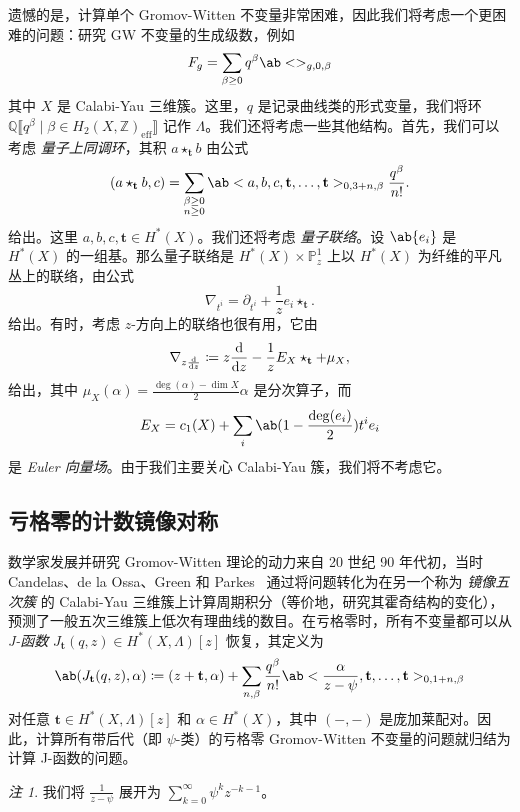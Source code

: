 \documentclass{amsart}
\theoremstyle{definition}
\theoremstyle{remark}
\newtheorem{rmk}[thm]{注}
\theoremstyle{plain}
\theoremstyle{definition}
\theoremstyle{remark}
\newcommand{\Z}{\mathbb{Z}}
\newcommand{\Q}{\mathbb{Q}}
\renewcommand{\P}{\mathbb{P}}
\newcommand{\mbf}[1]{\mathbf{#1}}
\newcommand{\mr}[1]{\mathrm{#1}}
\newcommand{\1}{\mathbf{1}}
\newcommand{\2}{\mathbf{2}}
\newcommand{\3}{\mathbf{3}}
\newcommand{\ps}[1]{\llbracket #1 \rrbracket}
\begin{document}
遗憾的是，计算单个 Gromov-Witten 不变量非常困难，因此我们将考虑一个更困难的问题：研究 GW 不变量的生成级数，例如
\[ F_g = \sum_{\beta \geq 0} q^{\beta} \ab<>_{g,0,\beta} \]
其中 \(X\) 是 Calabi-Yau 三维簇。这里，\(q\) 是记录曲线类的形式变量，我们将环 \(\Q\ps{q^{\beta} \mid \beta \in H_2(X, \Z)_{\mr{eff}}}\) 记作 \(\Lambda\)。我们还将考虑一些其他结构。首先，我们可以考虑 \textit{量子上同调环}，其积 \(a \star_{\mbf{t}} b\) 由公式
\[
    (a \star_{\mbf{t}} b, c) = \sum_{\substack{\beta \geq 0 \\ n \geq 0}} \ab<a,b,c, \mbf{t}, \ldots, \mbf{t}>_{0,3+n,\beta} \frac{q^{\beta}}{n!}.
\]
给出。这里 \(a,b,c, \mbf{t} \in H^*(X)\)。我们还将考虑 \textit{量子联络}。设 \(\ab\{ e_i \}\) 是 \(H^*(X)\) 的一组基。那么量子联络是 \(H^*(X) \times \P^1_z\) 上以 \(H^*(X)\) 为纤维的平凡丛上的联络，由公式
\[ \nabla_{t^i} = \partial_{t^i} + \frac{1}{z} e_i \star_{\mbf{t}}. \]
给出。有时，考虑 \(z\)-方向上的联络也很有用，它由
\[ \nabla_{z \odv{}{z}} \coloneqq z \odv{}{z} - \frac{1}{z} E_X \star_{\mbf{t}} + \mu_X, \]
给出，其中 \(\mu_X(\alpha) = \frac{\deg(\alpha) - \dim X}{2} \alpha\) 是分次算子，而
\[ E_X = c_1(X) + \sum_i \ab(1 - \frac{\deg(e_i)}{2})t^i e_i \]
是 \textit{Euler 向量场}。由于我们主要关心 Calabi-Yau 簇，我们将不考虑它。

\subsection{亏格零的计数镜像对称}%
\label{sub:Enumerative mirror symmetry in genus zero}

数学家发展并研究 Gromov-Witten 理论的动力来自 20 世纪 90 年代初，当时 Candelas、de la Ossa、Green 和 Parkes~\cite{CandelasEtAl1991} 通过将问题转化为在另一个称为 \textit{镜像五次簇} 的 Calabi-Yau 三维簇上计算周期积分（等价地，研究其霍奇结构的变化），预测了一般五次三维簇上低次有理曲线的数目。在亏格零时，所有不变量都可以从 \textit{J-函数} \(J_{\mbf{t}}(q,z) \in H^*(X, \Lambda)[z]\) 恢复，其定义为
\[ \ab( J_{\mbf{t}}(q, z), \alpha ) \coloneqq (z + \mbf{t}, \alpha) + \sum_{n, \beta} \frac{q^{\beta}}{n!} \ab< \frac{\alpha}{z-\psi}, \mbf{t}, \ldots, \mbf{t}>_{0,1+n, \beta} \]
对任意 \(\mbf{t} \in H^*(X, \Lambda)[z]\) 和 \(\alpha \in H^*(X)\)，其中 \((-,-)\) 是庞加莱配对。因此，计算所有带后代（即 \(\psi\)-类）的亏格零 Gromov-Witten 不变量的问题就归结为计算 J-函数的问题。

\begin{rmk}
    我们将 \(\frac{1}{z-\psi}\) 展开为 \(\sum_{k=0}^{\infty} \psi^k z^{-k-1}\)。
\end{rmk}
\end{document}
